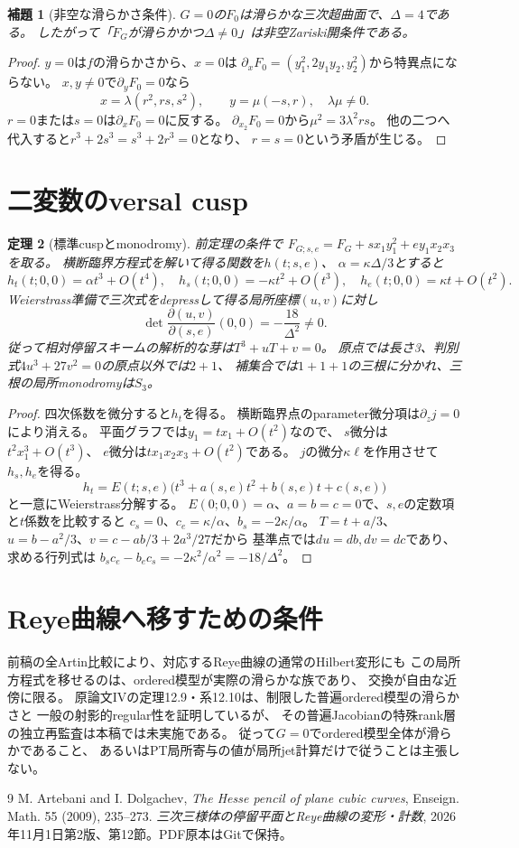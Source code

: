 \documentclass[11pt,a4paper]{ltjsarticle}
\newtheorem{theorem}{定理}[section]
\newtheorem{lemma}[theorem]{補題}
\begin{document}
\begin{lemma}[非空な滑らかさ条件]
$G=0$の$F_0$は滑らかな三次超曲面で、$\Delta=4$である。
したがって「$F_G$が滑らかかつ$\Delta\ne0$」は非空Zariski開条件である。
\end{lemma}
\begin{proof}
$y=0$は$f$の滑らかさから、$x=0$は
$\partial_xF_0=(y_1^2,2y_1y_2,y_2^2)$から特異点にならない。
$x,y\ne0$で$\partial_yF_0=0$なら
\[
x=\lambda(r^2,rs,s^2),\qquad y=\mu(-s,r),\quad \lambda\mu\ne0.
\]
$r=0$または$s=0$は$\partial_xF_0=0$に反する。
$\partial_{x_2}F_0=0$から$\mu^2=3\lambda^2rs$。
他の二つへ代入すると$r^3+2s^3=s^3+2r^3=0$となり、
$r=s=0$という矛盾が生じる。
\end{proof}

\section{二変数のversal cusp}
\begin{theorem}[標準cuspとmonodromy]
前定理の条件で
$F_{G;s,e}=F_G+sx_1y_1^2+ey_1x_2x_3$を取る。
横断臨界方程式を解いて得る関数を$h(t;s,e)$、
$\alpha=\kappa\Delta/3$とすると
\[
h_t(t;0,0)=\alpha t^3+O(t^4),\quad
h_s(t;0,0)=-\kappa t^2+O(t^3),\quad
h_e(t;0,0)=\kappa t+O(t^2).
\]
Weierstrass準備で三次式をdepressして得る局所座標$(u,v)$に対し
\[
\det\frac{\partial(u,v)}{\partial(s,e)}(0,0)
=-\frac{18}{\Delta^2}\ne0.
\]
従って相対停留スキームの解析的な芽は$T^3+uT+v=0$。
原点では長さ3、判別式$4u^3+27v^2=0$の原点以外では$2+1$、
補集合では$1+1+1$の三根に分かれ、三根の局所monodromyは$S_3$。
\end{theorem}
\begin{proof}
四次係数を微分すると$h_t$を得る。
横断臨界点のparameter微分項は$\partial_zj=0$により消える。
平面グラフでは$y_1=tx_1+O(t^2)$なので、
$s$微分は$t^2x_1^3+O(t^3)$、
$e$微分は$tx_1x_2x_3+O(t^2)$である。
$j$の微分$\kappa\ell$を作用させて$h_s,h_e$を得る。
\[
h_t=E(t;s,e)\bigl(t^3+a(s,e)t^2+b(s,e)t+c(s,e)\bigr)
\]
と一意にWeierstrass分解する。
$E(0;0,0)=\alpha$、$a=b=c=0$で、$s,e$の定数項と$t$係数を比較すると
$c_s=0$、$c_e=\kappa/\alpha$、$b_s=-2\kappa/\alpha$。
$T=t+a/3$、
$u=b-a^2/3$、$v=c-ab/3+2a^3/27$だから
基準点では$du=db,dv=dc$であり、求める行列式は
$b_sc_e-b_ec_s=-2\kappa^2/\alpha^2=-18/\Delta^2$。
\end{proof}
\section{Reye曲線へ移すための条件}
前稿の全Artin比較により、対応するReye曲線の通常のHilbert変形にも
この局所方程式を移せるのは、ordered模型が実際の滑らかな族であり、
交換が自由な近傍に限る。
原論文IVの定理12.9・系12.10は、制限した普遍ordered模型の滑らかさと
一般の射影的regular性を証明しているが、
その普遍Jacobianの特殊rank層の独立再監査は本稿では未実施である。
従って$G=0$でordered模型全体が滑らかであること、
あるいはPT局所寄与の値が局所jet計算だけで従うことは主張しない。
\begin{thebibliography}{9}
 M. Artebani and I. Dolgachev,
\emph{The Hesse pencil of plane cubic curves}, Enseign. Math. 55 (2009), 235--273.
 \emph{三次三様体の停留平面とReye曲線の変形・計数},
2026年11月1日第2版、第12節。PDF原本はGitで保持。
\end{thebibliography}
\end{document}
